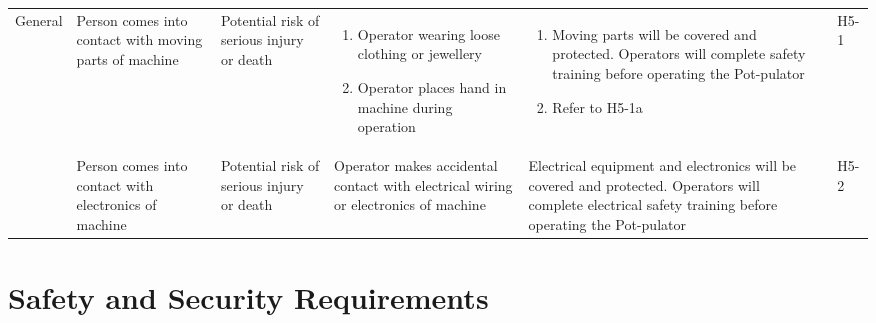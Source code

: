 \documentclass{article}
\begin{document}
\begin{landscape}
\begin{center}
\begin{longtable}{|l|  p{3cm}  p{4cm}  p{4cm}  p{4cm}  p{1cm}  p{1cm}|}
        \hline

        General&
        Person comes into contact with moving parts of machine&
        Potential risk of serious injury or death&
        \begin{enumerate}[label=(\alph*)]
            \item Operator wearing loose clothing or jewellery
            \item Operator places hand in machine during operation
        \end{enumerate}&
        \begin{enumerate}[label=(\alph*)]
            \item Moving parts will be covered and protected. Operators will complete safety training before operating the Pot-pulator
            \item Refer to H5-1a
        \end{enumerate}&
        &
        H5-1\\

        &
        Person comes into contact with electronics of machine&
        Potential risk of serious injury or death&
        Operator makes accidental contact with electrical wiring or electronics of machine&
        Electrical equipment and electronics will be covered and protected. Operators will complete electrical safety training before operating the Pot-pulator&
        &
        H5-2\\


    \cline{2-7}
    \hline

    \end{longtable}
\end{center}
\end{landscape}


\newpage

\section{Safety and Security Requirements}

\end{document}
